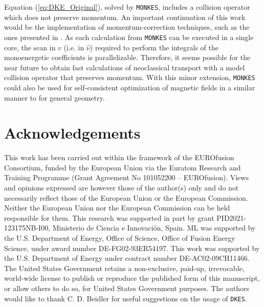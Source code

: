\documentclass[10pt]{iopart}
\newcommand{\MONKES}{{\texttt{MONKES}}}
\newcommand{\DKES}{{\texttt{DKES}}}
\begin{document}
Equation (\ref{eq:DKE_Original}), solved by {\MONKES}, includes a collision operator which does not preserve momentum. An important continuation of this work would be the implementation of momentum-correction techniques, such as the ones presented in \cite{Taguchi,Sugama-PENTA,Sugama2008,MaasbergMomentumCorrection}. As each calculation from {\MONKES} can be executed in a single core, the scan in $v$ (i.e. in $\hat{\nu}$) required to perform the integrals of the monoenergetic coefficients is parallelizable. Therefore, it seems possible for the near future to obtain fast calculations of neoclassical transport with a model collision operator that preserves momentum. With this minor extension, {\MONKES} could also be used for self-consistent optimization of magnetic fields in a similar manner to \cite{Landreman_SelfConsistent} for general geometry. 









 
\section*{Acknowledgements}
This work has been carried out within the framework of the EUROfusion Consortium, funded by the European Union via the Euratom Research and Training Programme (Grant Agreement No 101052200 – EUROfusion). Views and opinions expressed are however those of the author(s) only and do not necessarily reflect those of the European Union or the European Commission. Neither the European Union nor the European Commission can be held responsible for them. This research was supported in part by grant PID2021-123175NB-I00, Ministerio de Ciencia e Innovación, Spain. ML was supported by the U.S. Department of Energy, Office of Science, Office of Fusion Energy Science, under award number DE-FG02-93ER54197. This work was supported by the U.S. Department of Energy under contract number DE-AC02-09CH11466. The United States Government retains a non-exclusive, paid-up, irrevocable, world-wide license to publish or reproduce the published form of this manuscript, or allow others to do so, for United States Government purposes. The authors would like to thank C. D. Beidler for useful suggestions on the usage of {\DKES}.


\FloatBarrier
\appendix
\end{document}
